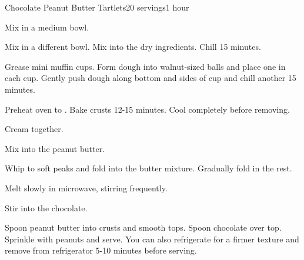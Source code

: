 \documentclass[../Cookbook.tex]{subfiles}
\begin{document}
\begin{recipe}{Chocolate Peanut Butter Tartlets}{20 servings}{1 hour}

Mix in a medium bowl.

Mix in a different bowl. Mix into the dry ingredients. Chill 15 minutes.

Grease mini muffin cups. Form dough into walnut-sized balls and place one in each cup. Gently push dough along bottom and sides of cup and chill another 15 minutes.

Preheat oven to . Bake crusts 12-15 minutes. Cool completely before removing.

Cream together.

Mix into the peanut butter.

Whip to soft peaks and fold  into the butter mixture. Gradually fold in the rest.

Melt slowly in microwave, stirring frequently.

Stir into the chocolate.

Spoon peanut butter into crusts and smooth tops. Spoon chocolate over top. Sprinkle with peanuts and serve.
You can also refrigerate for a firmer texture and remove from refrigerator 5-10 minutes before serving.

\end{recipe}
\end{document}
